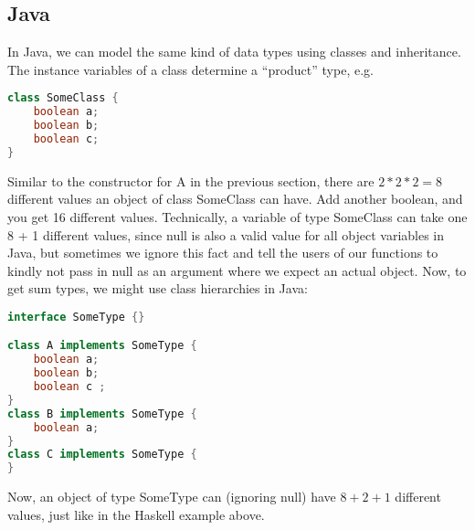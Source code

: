             \subsection*{Java}
            In Java, we can model the same kind of data types using classes and inheritance. The instance
            variables of a class determine a “product” type, e.g.

            \begin{lstlisting}[language=Java]
class SomeClass {
    boolean a;
    boolean b;
    boolean c;
}
            \end{lstlisting}
    Similar to the constructor for A in the previous section, there are $2 * 2 * 2 = 8$ different
    values an object of class SomeClass can have. Add another boolean, and you get 16 different
    values. Technically, a variable of type SomeClass can take one 8 + 1 different values, since
    null is also a valid value for all object variables in Java, but sometimes we ignore this fact
    and tell the users of our functions to kindly not pass in null as an argument where we expect
    an actual object.
    Now, to get sum types, we might use class hierarchies in Java:
    
    \newpage
    \begin{lstlisting}[language=Java]
interface SomeType {}

class A implements SomeType {
    boolean a;
    boolean b;
    boolean c ;
}
class B implements SomeType {
    boolean a;
}
class C implements SomeType {
}
    \end{lstlisting}
    Now, an object of type SomeType can (ignoring null) have $8 + 2 + 1$ different values,
    just like in the Haskell example above.

